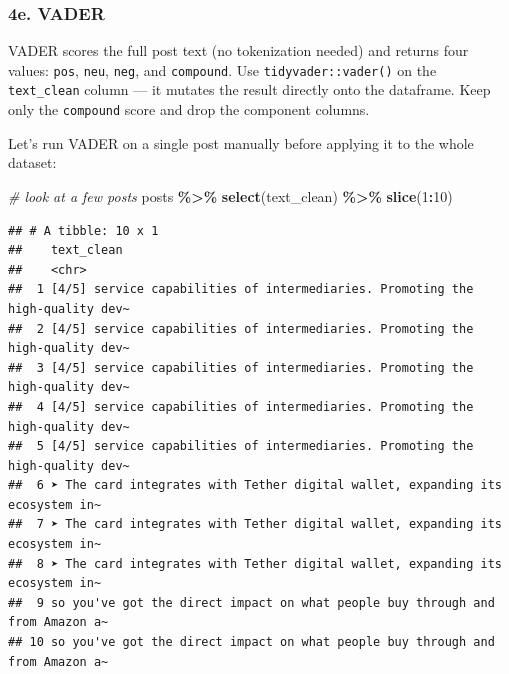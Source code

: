 \documentclass[
]{article}
\newenvironment{Shaded}{\begin{snugshade}}{\end{snugshade}}
\newcommand{\CommentTok}[1]{\textcolor[rgb]{0.56,0.35,0.01}{\textit{#1}}}
\newcommand{\DecValTok}[1]{\textcolor[rgb]{0.00,0.00,0.81}{#1}}
\newcommand{\FunctionTok}[1]{\textcolor[rgb]{0.13,0.29,0.53}{\textbf{#1}}}
\newcommand{\NormalTok}[1]{#1}
\newcommand{\SpecialCharTok}[1]{\textcolor[rgb]{0.81,0.36,0.00}{\textbf{#1}}}
\begin{document}
\subsubsection{4e. VADER}\label{e.-vader}

VADER scores the full post text (no tokenization needed) and returns
four values: \texttt{pos}, \texttt{neu}, \texttt{neg}, and
\texttt{compound}. Use \texttt{tidyvader::vader()} on the
\texttt{text\_clean} column --- it mutates the result directly onto the
dataframe. Keep only the \texttt{compound} score and drop the component
columns.

Let's run VADER on a single post manually before applying it to the
whole dataset:

\begin{Shaded}
\begin{Highlighting}[]
\CommentTok{\# look at a few posts}
\NormalTok{posts }\SpecialCharTok{\%\textgreater{}\%} \FunctionTok{select}\NormalTok{(text\_clean) }\SpecialCharTok{\%\textgreater{}\%} \FunctionTok{slice}\NormalTok{(}\DecValTok{1}\SpecialCharTok{:}\DecValTok{10}\NormalTok{)}
\end{Highlighting}
\end{Shaded}

\begin{verbatim}
## # A tibble: 10 x 1
##    text_clean                                                                   
##    <chr>                                                                        
##  1 [4/5] service capabilities of intermediaries. Promoting the high-quality dev~
##  2 [4/5] service capabilities of intermediaries. Promoting the high-quality dev~
##  3 [4/5] service capabilities of intermediaries. Promoting the high-quality dev~
##  4 [4/5] service capabilities of intermediaries. Promoting the high-quality dev~
##  5 [4/5] service capabilities of intermediaries. Promoting the high-quality dev~
##  6 ➤ The card integrates with Tether digital wallet, expanding its ecosystem in~
##  7 ➤ The card integrates with Tether digital wallet, expanding its ecosystem in~
##  8 ➤ The card integrates with Tether digital wallet, expanding its ecosystem in~
##  9 so you've got the direct impact on what people buy through and from Amazon a~
## 10 so you've got the direct impact on what people buy through and from Amazon a~
\end{verbatim}

\begin{Shaded}
\end{Shaded}
\end{document}
